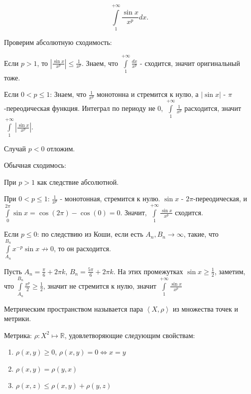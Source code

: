 \begin{example} \thmslashn

    \[ \int\limits_{1}^{+\infty} \frac{\sin x}{x^{p}}dx  .\]

    Проверим абсолютную сходимость:

    Если $p > 1$, то $\left| \frac{\sin x}{x^{p}}\right| \le \frac{1}{x^{p}}$. Знаем, что $\int\limits_{1}^{+\infty} \frac{dx}{x^{p}} $ - сходится, значит оригинальный тоже.

    Если $0 < p \le 1$: Знаем, что $\frac{1}{x^{p}}$ монотонна и стремится к нулю, а $|\sin x| $ - $\pi$-переодическая функция. Интеграл по периоду не $0$, $\int\limits_{1}^{+\infty} \frac{1}{x^{p}} $ расходится, значит $\int\limits_{1}^{+\infty} \left| \frac{\sin x}{x^{p}}\right| $.

    Случай $p < 0$ отложим.

    Обычная сходимось:

    При $p > 1$ как следствие абсолютной.

    При $0 < p \le 1$: $\frac{1}{x^{p}}$ - монотонная, стремится к нулю. $\sin x$ - $2\pi$-переодическая, и $\int\limits_{0}^{2\pi} \sin x = \cos(2\pi) - \cos(0) = 0 $. Значит, $\int\limits_{1}^{+\infty} \frac{\sin x}{x^{p}} $ сходится.

    Если $p \le 0$: по следствию из Коши, если есть $A_{n}, B_{n} \to  \infty$, такие, что $\int\limits_{A_{n}}^{B_{n}} x^{-p}\sin x \not \to 0  $, то он расходится.

    Пусть $A_{n} = \frac{\pi}{6} + 2\pi k$, $B_{n} = \frac{5\pi}{6} + 2\pi k$. На этих промежутках $\sin x \ge \frac{1}{2}$, заметим, что $\int\limits_{A_{n}}^{B_{n}} \frac{x^{p}}{2} \ge \frac{1}{2} $, значит не стремится к нулю, значит $\int\limits_{1}^{+\infty} \frac{\sin x}{x^{p}} $
\end{example}
\begin{definition} \thmslashn 

Метрическим пространством называется пара $\left<X, \rho\right>$ из множества точек и метрики.

Метрика: $\rho : X^2 \mapsto \mathbb{R}$, удовлетворяющие следующим свойствам:
\begin{enumerate}
    \item $\rho(x, y) \ge 0$, $\rho(x, y) = 0 \iff x = y$
    \item $\rho(x, y) = \rho(y, x)$
    \item $\rho(x, z) \le \rho(x, y) + \rho(y, z)$
\end{enumerate}
\end{definition}
